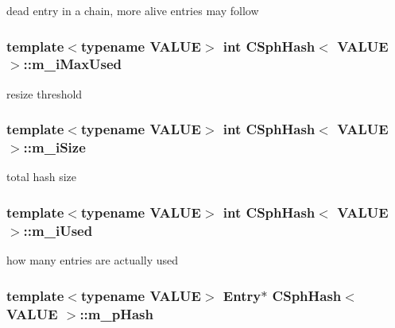 dead entry in a chain, more alive entries may follow 

\hypertarget{classCSphHash_aa9d82d8b942bfd6108f13846572f5fd1}{
\subsubsection[{m\-\_\-i\-Max\-Used}]{\setlength{\rightskip}{0pt plus 5cm}template$<$typename V\-A\-L\-U\-E$>$ {\bf int} {\bf C\-Sph\-Hash}$<$ V\-A\-L\-U\-E $>$\-::m\-\_\-i\-Max\-Used\hspace{0.3cm}{\ttfamily [protected]}}}\label{classCSphHash_aa9d82d8b942bfd6108f13846572f5fd1}


resize threshold 

\hypertarget{classCSphHash_aa663254fba48d19d48fdbcf26efe3c0b}{
\subsubsection[{m\-\_\-i\-Size}]{\setlength{\rightskip}{0pt plus 5cm}template$<$typename V\-A\-L\-U\-E$>$ {\bf int} {\bf C\-Sph\-Hash}$<$ V\-A\-L\-U\-E $>$\-::m\-\_\-i\-Size\hspace{0.3cm}{\ttfamily [protected]}}}\label{classCSphHash_aa663254fba48d19d48fdbcf26efe3c0b}


total hash size 

\hypertarget{classCSphHash_a9be7c076d19b413992a1ce0ebb724476}{
\subsubsection[{m\-\_\-i\-Used}]{\setlength{\rightskip}{0pt plus 5cm}template$<$typename V\-A\-L\-U\-E$>$ {\bf int} {\bf C\-Sph\-Hash}$<$ V\-A\-L\-U\-E $>$\-::m\-\_\-i\-Used\hspace{0.3cm}{\ttfamily [protected]}}}\label{classCSphHash_a9be7c076d19b413992a1ce0ebb724476}


how many entries are actually used 

\hypertarget{classCSphHash_a554d27a66fb80b17c58073bcf231fa44}{
\subsubsection[{m\-\_\-p\-Hash}]{\setlength{\rightskip}{0pt plus 5cm}template$<$typename V\-A\-L\-U\-E$>$ {\bf Entry}$\ast$ {\bf C\-Sph\-Hash}$<$ V\-A\-L\-U\-E $>$\-::m\-\_\-p\-Hash\hspace{0.3cm}{\ttfamily [protected]}}}\label{classCSphHash_a554d27a66fb80b17c58073bcf231fa44}


